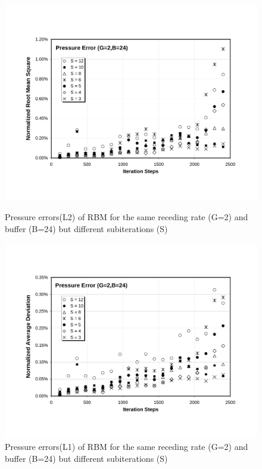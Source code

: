 \cp

\begin{figure}[htbp]
  \begin{center}    \includegraphics[scale=0.6]{../figures/Exp3-CASE1-dt0.005/G_2_B_24/G2-B24-P-NRMS.pdf}
    \caption{Pressure errors(L2) of RBM for the same receding rate (G=2) and buffer (B=24) but different subiterations (S)}
        \vspace{0.5in}
\includegraphics[scale=0.6]{../figures/Exp3-CASE1-dt0.005/G_2_B_24/G2-B24-P-NAD.pdf}
    \caption{Pressure errors(L1) of RBM for the same receding rate (G=2) and buffer (B=24) but different subiterations (S)}
  \end{center}
\end{figure}

